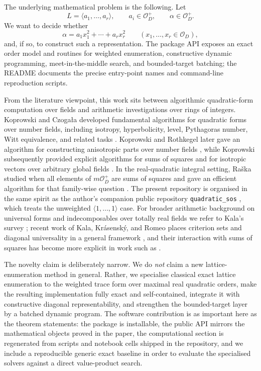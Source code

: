 \documentclass[manuscript]{acmart}
\theoremstyle{plain}
\theoremstyle{definition}
\theoremstyle{nonitalicremark}
\newcommand{\OO}{\mathcal{O}}
\newcommand{\OD}{\OO_D}
\begin{document}
The underlying mathematical problem is the following. Let
\[
L=\langle a_1,\dots,a_r\rangle,
\qquad a_i\in\OD^+,
\qquad \alpha\in\OD^+.
\]
We want to decide whether
\[
\alpha = a_1x_1^2+\cdots+a_rx_r^2
\qquad (x_1,\dots,x_r\in\OD),
\]
and, if so, to construct such a representation. The package API exposes an exact order
model and routines for weighted enumeration, constructive dynamic programming,
meet-in-the-middle search, and bounded-target batching; the README documents the
precise entry-point names and command-line reproduction scripts.

From the literature viewpoint, this work sits between algorithmic quadratic-form computation over
fields and arithmetic investigations over rings of integers. Koprowski and Czoga{\l}a developed
fundamental algorithms for quadratic forms over number fields, including isotropy, hyperbolicity,
level, Pythagoras number, Witt equivalence, and related tasks \cite{KopCz}. Koprowski and
Rothkegel later gave an algorithm for constructing anisotropic parts over number fields
\cite{KopRoth}, while Koprowski subsequently provided explicit algorithms for sums of squares and
for isotropic vectors over arbitrary global fields \cite{KopSq,KopIso}. In the real-quadratic
integral setting, Ra\v ska studied when all elements of $m\OD^+$ are sums of squares and gave an
efficient algorithm for that family-wise question \cite{Raska}. The present repository is organised
in the same spirit as the author's companion public repository \texttt{quadratic\_sos} \cite{KaniaQSOS},
which treats the unweighted $\langle 1,\dots,1\rangle$ case. For broader arithmetic background on universal forms and
indecomposables over totally real fields we refer to Kala's survey \cite{KalaSurvey}; recent work
of Kala, Kr\'asensk\'y, and Romeo places criterion sets and diagonal universality in a general
framework \cite{KKR}, and their interaction with sums of squares has become more explicit in work
such as \cite{KKK}.

The novelty claim is deliberately narrow. We do \emph{not} claim a new lattice-enumeration method
in general. Rather, we specialise classical exact lattice enumeration to the weighted trace form
over maximal real quadratic orders, make the resulting implementation fully exact and self-contained,
integrate it with constructive diagonal representability, and strengthen the bounded-target layer by
a batched dynamic program. The software contribution is as important here as the theorem statements:
the package is installable, the public API mirrors the mathematical objects proved in the paper, the
computational section is regenerated from scripts and notebook cells shipped in the repository, and
we include a reproducible generic exact baseline in order to evaluate the specialised solvers against
a direct value-product search.
\end{document}
